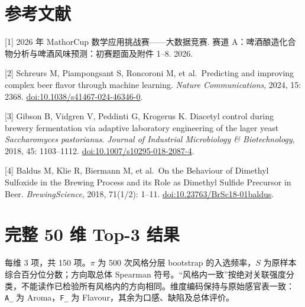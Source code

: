\documentclass[
  chinese,
  11pt,
]{article}
\begin{document}
\section*{参考文献}\label{ux53c2ux8003ux6587ux732e}

{[}1{]} 2026 年 MathorCup 数学应用挑战赛------大数据竞赛. 赛道
A：啤酒酿造化合物分析与啤酒风味预测：初赛题面及附件 1--8. 2026.

{[}2{]} Schreurs M, Piampongsant S, Roncoroni M, et al.~Predicting and
improving complex beer flavor through machine learning. \emph{Nature
Communications}, 2024, 15: 2368.
\href{https://doi.org/10.1038/s41467-024-46346-0}{doi:10.1038/s41467-024-46346-0}.

{[}3{]} Gibson B, Vidgren V, Peddinti G, Krogerus K. Diacetyl control
during brewery fermentation via adaptive laboratory engineering of the
lager yeast \emph{Saccharomyces pastorianus}. \emph{Journal of
Industrial Microbiology \& Biotechnology}, 2018, 45: 1103--1112.
\href{https://doi.org/10.1007/s10295-018-2087-4}{doi:10.1007/s10295-018-2087-4}.

{[}4{]} Baldus M, Klie R, Biermann M, et al.~On the Behaviour of
Dimethyl Sulfoxide in the Brewing Process and its Role as Dimethyl
Sulfide Precursor in Beer. \emph{BrewingScience}, 2018, 71(1/2): 1--11.
\href{https://doi.org/10.23763/BrSc18-01baldus}{doi:10.23763/BrSc18-01baldus}.

\newpage
\appendix

\section{完整 50 维 Top-3
结果}\label{ux5b8cux6574-50-ux7ef4-top-3-ux7ed3ux679c}

每维 3 项，共 150 项。\(\pi\) 为 500 次风格分层 bootstrap
的入选频率，\(S\) 为原样本综合百分位分数；方向取总体 Spearman
符号。``风格内一致''按绝对关联强度分类，不能读作已检验所有风格内的方向相同。维度编码保持与原始感官表一致：\texttt{A\_}
为 Aroma，\texttt{F\_} 为 Flavour，其余为口感、缺陷及总体评价。
\end{document}
